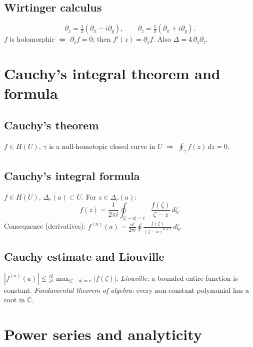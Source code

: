\medskip

\subsection{Wirtinger calculus}
\label{subsec:wirtinger}

$$\partial_z=\tfrac12(\partial_x-i\partial_y),\qquad
\partial_{\bar z}=\tfrac12(\partial_x+i\partial_y).$$
$f$ is holomorphic $\iff$ $\partial_{\bar z}f=0$; then $f'(z)=\partial_z f$. Also $\Delta=4\,\partial_z\partial_{\bar z}$.

\medskip

\section{Cauchy's integral theorem and formula}
\label{sec:cauchy-integral}

\subsection{Cauchy's theorem}
\label{subsec:cauchy-theorem}

$f\in H(U)$, $\gamma$ is a null-homotopic closed curve in $U$ $\Rightarrow$ $\oint_\gamma f(z)\,dz=0$.

\subsection{Cauchy's integral formula}
\label{subsec:cauchy-formula}

$f\in H(U)$, $\overline{\Delta_r(a)}\subset U$. For $z\in\Delta_r(a)$:
$$f(z)=\frac1{2\pi i}\oint_{|\zeta-a|=r}\frac{f(\zeta)}{\zeta-z}\,d\zeta.$$
Consequence (derivatives): $f^{(n)}(a)=\frac{n!}{2\pi i}\oint\frac{f(\zeta)}{(\zeta-a)^{n+1}}\,d\zeta$.

\subsection{Cauchy estimate and Liouville}
\label{subsec:cauchy-estimate}

$|f^{(n)}(a)|\le\frac{n!}{r^n}\max_{|\zeta-a|=r}|f(\zeta)|$.
\textit{Liouville:} a bounded entire function is constant. \textit{Fundamental theorem of algebra:} every non-constant polynomial has a root in $\mathbb{C}$.

\medskip

\section{Power series and analyticity}
\label{sec:power-series-complex}

